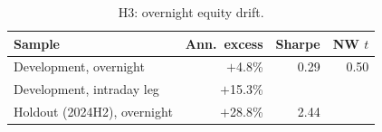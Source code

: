 \documentclass[../main.tex]{subfiles}
\begin{document}
\begin{table}[tbp]
\centering\small
\caption{H3: overnight equity drift.}\label{tab:h3}
\begin{tabular}{@{}lrrr@{}}
\toprule
Sample & Ann.\ excess & Sharpe & NW $t$ \\
\midrule
Development, overnight & $+$4.8\% & 0.29 & 0.50 \\
Development, intraday leg & $+$15.3\% & & \\
Holdout (2024H2), overnight & $+$28.8\% & 2.44 & \\
\bottomrule
\end{tabular}
\end{table}

\end{document}
